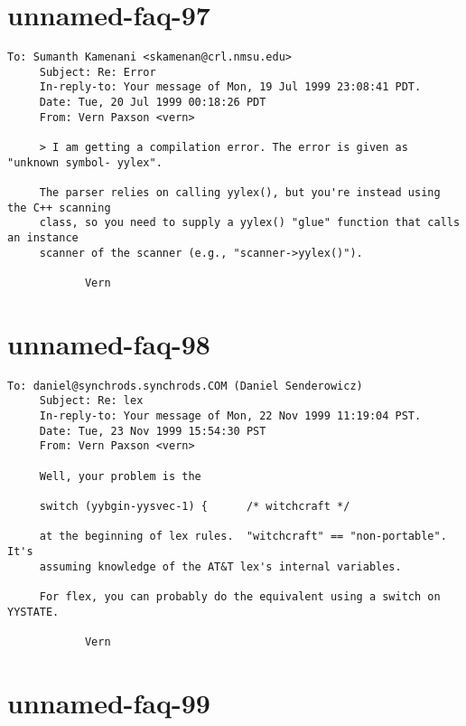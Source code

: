 \documentclass[openany,oneside]{book}
\begin{document}
\section{unnamed-faq-97}

\begin{verbatim}
To: Sumanth Kamenani <skamenan@crl.nmsu.edu>
     Subject: Re: Error
     In-reply-to: Your message of Mon, 19 Jul 1999 23:08:41 PDT.
     Date: Tue, 20 Jul 1999 00:18:26 PDT
     From: Vern Paxson <vern>
     
     > I am getting a compilation error. The error is given as "unknown symbol- yylex".
     
     The parser relies on calling yylex(), but you're instead using the C++ scanning
     class, so you need to supply a yylex() "glue" function that calls an instance
     scanner of the scanner (e.g., "scanner->yylex()").
     
     		Vern
\end{verbatim}

\section{unnamed-faq-98}

\begin{verbatim}
To: daniel@synchrods.synchrods.COM (Daniel Senderowicz)
     Subject: Re: lex
     In-reply-to: Your message of Mon, 22 Nov 1999 11:19:04 PST.
     Date: Tue, 23 Nov 1999 15:54:30 PST
     From: Vern Paxson <vern>
     
     Well, your problem is the
     
     switch (yybgin-yysvec-1) {      /* witchcraft */
     
     at the beginning of lex rules.  "witchcraft" == "non-portable".  It's
     assuming knowledge of the AT&T lex's internal variables.
     
     For flex, you can probably do the equivalent using a switch on YYSTATE.
     
     		Vern
\end{verbatim}

\section{unnamed-faq-99}
\end{document}
